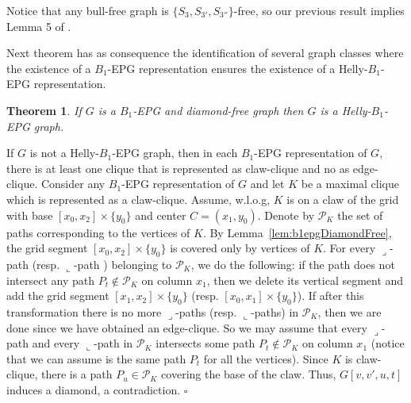 \documentclass[9pt]{entcs}
\newtheorem{teo}[thm]{Theorem}%
\begin{document}



Notice that any bull-free graph is $\{S_{3}, S_{3'}, S_{3''}\}$-free, so our previous result implies  Lemma 5 of  \cite{ries2009}.






Next theorem has as consequence the identification of several graph classes where the existence of a $B_1$-EPG representation ensures the existence of a Helly-$B_1$-EPG representation.


\begin{teo} \label{lem:b1DiamondFree}
 If $G$ is a $B_1$-EPG and diamond-free graph then $G$ is a Helly-$B_1$-EPG graph.
 \end{teo}

\begin{pf}
If $G$ is not a Helly-$B_1$-EPG graph, then in each $B_1$-EPG representation of $G$, there is at least one clique that is represented as claw-clique and no as edge-clique.  Consider any $B_1$-EPG  representation of $G$  and let $K$ be a maximal clique  which is represented as a claw-clique. Assume, w.l.o.g,  $K$ is on a claw of the grid with base $[x_0, x_2]\times\{y_0\}$ and center $C = (x_1, y_0)$. Denote by  $\mathcal{P}_K$ the set of paths corresponding to the vertices of $K$. 
 By Lemma~\ref{lem:b1epgDiamondFree},  %
the grid segment $[x_0, x_2]\times\{y_0\}$ is covered only by vertices of $K$. %
 For every ${\displaystyle \lrcorner}$-path %
 (resp. ${\displaystyle \llcorner}$-path 
 ) belonging to $\mathcal{P}_K$, we do the following: if %
 the path does not intersect any path $P_t \notin\mathcal{P}_K$ on column $x_1$, then we delete its vertical segment and add the grid segment $[x_1, x_2]\times\{y_0\}$ (resp. $[x_0, x_1]\times\{y_0\}$). If after this transformation there is no more ${\displaystyle \lrcorner}$-paths (resp. ${\displaystyle \llcorner}$-paths) in $\mathcal{P}_K$, then we are done since we have obtained an edge-clique. So we may assume that
 every ${\displaystyle \lrcorner}$-path   and every ${\displaystyle \llcorner}$-path  in $ \mathcal{P}_K$ intersects some path $P_t \notin \mathcal{P}_K$   on column $x_1$ (notice that we can assume is the same path $P_t$ for all the vertices). Since  $K$ is claw-clique,  there is a path $P_u \in \mathcal{P}_K$ covering the base of the claw. Thus, $G[v, v', u, t]$ induces a diamond,  a contradiction. $\square$
\end{pf}  
\end{document}
